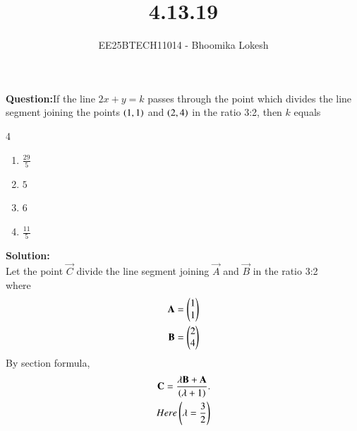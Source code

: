 \documentclass[journal,onecolumn]{IEEEtran}
\begin{document}

\vspace{3cm}

\title{4.13.19}
\author{EE25BTECH11014 - Bhoomika Lokesh}
{\let\newpage\relax\maketitle}

\renewcommand{\thefigure}{\theenumi}
\renewcommand{\thetable}{\theenumi}
\setlength{\intextsep}{10pt} %

\renewcommand{\thetable}{\theenumi}


\textbf{Question:}If the line $2x+y=k$ passes through the point which divides the line segment joining the points $\left(1,1\right)$ and $\left(2,4\right)$ in the ratio 3:2, then $k$ equals
\begin{multicols}{4}
\begin{enumerate}
    \item $\frac{29}{5}$
    \item $5$
    \item $6$
    \item $\frac{11}{5}$
\end{enumerate}
\end{multicols}

\textbf{Solution:}\\
Let the point $\vec{C}$ divide the line segment joining $\vec{A}$ and $\vec{B}$ in the ratio 3:2\\
where\begin{align}
    \mathbf{A}=\begin{pmatrix}1\\1\end{pmatrix}\\
    \mathbf{B}=\begin{pmatrix}2\\4\end{pmatrix}
\end{align}
By section formula,
\begin{align}
   \mathbf{C}=\frac{\lambda\mathbf{B}+\mathbf{A}} {\left(\lambda +1\right)}.\\  
    Here \left(\lambda=\frac{3}{2}\right)
\end{align}
\end{document}
